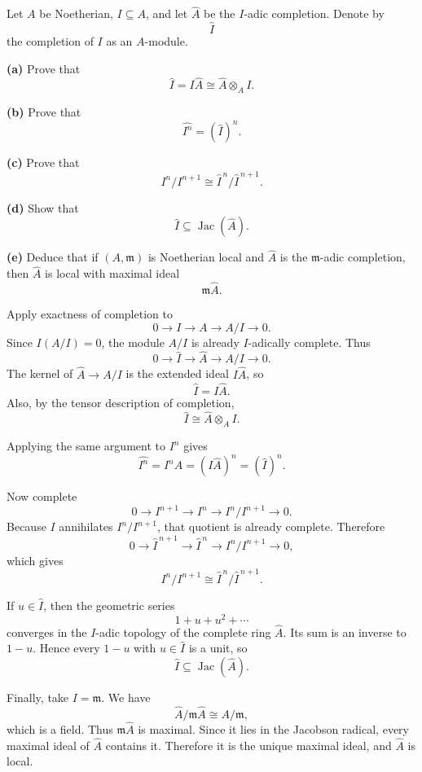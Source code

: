 \begin{problem}[CP-V-0032]
\label{prob:cp-v-0032}
Let \(A\) be Noetherian, \(I\subseteq A\), and let \(\widehat A\) be the
\(I\)-adic completion. Denote by
\[
\widehat I
\]
the completion of \(I\) as an \(A\)-module.

\textbf{(a)} Prove that
\[
\widehat I=I\widehat A
\cong
\widehat A\otimes_A I.
\]

\textbf{(b)} Prove that
\[
\widehat{I^n}=(\widehat I)^n.
\]

\textbf{(c)} Prove that
\[
I^n/I^{n+1}
\cong
\widehat I^{\,n}/\widehat I^{\,n+1}.
\]

\textbf{(d)} Show that
\[
\widehat I\subseteq\operatorname{Jac}(\widehat A).
\]

\textbf{(e)} Deduce that if \((A,\mathfrak m)\) is Noetherian local and
\(\widehat A\) is the \(\mathfrak m\)-adic completion, then \(\widehat A\)
is local with maximal ideal
\[
\mathfrak m\widehat A.
\]
\end{problem}

\begin{solution}
Apply exactness of completion to
\[
0\longrightarrow I\longrightarrow A\longrightarrow A/I\longrightarrow0.
\]
Since \(I(A/I)=0\), the module \(A/I\) is already \(I\)-adically complete.
Thus
\[
0\longrightarrow\widehat I
\longrightarrow\widehat A
\longrightarrow A/I
\longrightarrow0.
\]
The kernel of \(\widehat A\to A/I\) is the extended ideal \(I\widehat A\),
so
\[
\widehat I=I\widehat A.
\]
Also, by the tensor description of completion,
\[
\widehat I\cong\widehat A\otimes_A I.
\]

Applying the same argument to \(I^n\) gives
\[
\widehat{I^n}
=
I^n\widehat A
=
(I\widehat A)^n
=
(\widehat I)^n.
\]

Now complete
\[
0\longrightarrow I^{n+1}
\longrightarrow I^n
\longrightarrow I^n/I^{n+1}
\longrightarrow0.
\]
Because \(I\) annihilates \(I^n/I^{n+1}\), that quotient is already complete.
Therefore
\[
0\longrightarrow
\widehat I^{\,n+1}
\longrightarrow
\widehat I^{\,n}
\longrightarrow
I^n/I^{n+1}
\longrightarrow0,
\]
which gives
\[
I^n/I^{n+1}
\cong
\widehat I^{\,n}/\widehat I^{\,n+1}.
\]

If \(u\in\widehat I\), then the geometric series
\[
1+u+u^2+\cdots
\]
converges in the \(I\)-adic topology of the complete ring \(\widehat A\).
Its sum is an inverse to \(1-u\). Hence every \(1-u\) with
\(u\in\widehat I\) is a unit, so
\[
\widehat I\subseteq\operatorname{Jac}(\widehat A).
\]

Finally, take \(I=\mathfrak m\). We have
\[
\widehat A/\mathfrak m\widehat A
\cong
A/\mathfrak m,
\]
which is a field. Thus \(\mathfrak m\widehat A\) is maximal. Since it lies
in the Jacobson radical, every maximal ideal of \(\widehat A\) contains it.
Therefore it is the unique maximal ideal, and \(\widehat A\) is local.
\end{solution}


